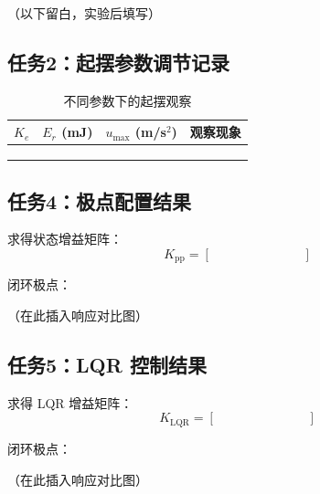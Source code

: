 \documentclass[12pt, a4paper]{article}
\begin{document}
（以下留白，实验后填写）

\subsection{任务2：起摆参数调节记录}

\begin{table}[H]
\centering
\caption{不同参数下的起摆观察}
\begin{tabular}{cccp{6cm}}
\toprule
$K_e$ & $E_r$ (mJ) & $u_\text{max}$ (m/s$^2$) & 观察现象 \\
\midrule
  &   &   & \\[1em]
  &   &   & \\[1em]
  &   &   & \\[1em]
\bottomrule
\end{tabular}
\end{table}

\subsection{任务4：极点配置结果}

求得状态增益矩阵：
\[
K_\text{pp} = \begin{bmatrix} \quad & \quad & \quad & \quad \end{bmatrix}
\]

闭环极点：\underline{\quad\quad\quad\quad\quad\quad\quad\quad\quad\quad\quad\quad\quad\quad}

（在此插入响应对比图）

\subsection{任务5：LQR 控制结果}

求得 LQR 增益矩阵：
\[
K_\text{LQR} = \begin{bmatrix} \quad & \quad & \quad & \quad \end{bmatrix}
\]

闭环极点：\underline{\quad\quad\quad\quad\quad\quad\quad\quad\quad\quad\quad\quad\quad\quad}

（在此插入响应对比图）

\end{document}
